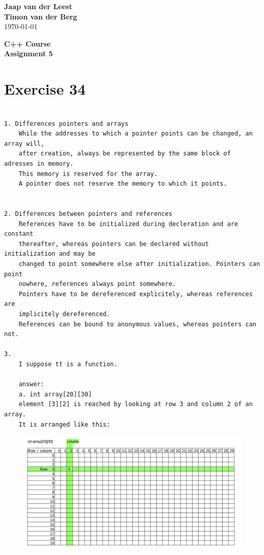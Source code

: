 \documentclass{article}[9pt]
\begin{document}
\begin{flushright}
	\textbf{Jaap van der Leest\\ Timon van der Berg \\ }
\today
\end{flushright}

\begin{center}
\textbf{C++ Course \\
Assignment 5} \\
\end{center}

\section*{Exercise 34}
\begin{verbatim}

1. Differences pointers and arrays
    While the addresses to which a pointer points can be changed, an array will,
    after creation, always be represented by the same block of adresses in memory. 
    This memory is reserved for the array. 
    A pointer does not reserve the memory to which it points. 


2. Differences between pointers and references
    References have to be initialized during decleration and are constant
    thereafter, whereas pointers can be declared without initialization and may be
    changed to point somewhere else after initialization. Pointers can point
    nowhere, references always point somewhere.
    Pointers have to be dereferenced explicitely, whereas references are
    implicitely dereferenced. 
    References can be bound to anonymous values, whereas pointers can not. 

3.
    I suppose tt is a function.

    answer:
    a. int array[20][30] 
    element [3][2] is reached by looking at row 3 and column 2 of an array.
    It is arranged like this:
\end{verbatim}
\begin{figure}[H]
\includegraphics[width=\textwidth]{../34/int_array.jpg}
\end{figure}
\end{document}

